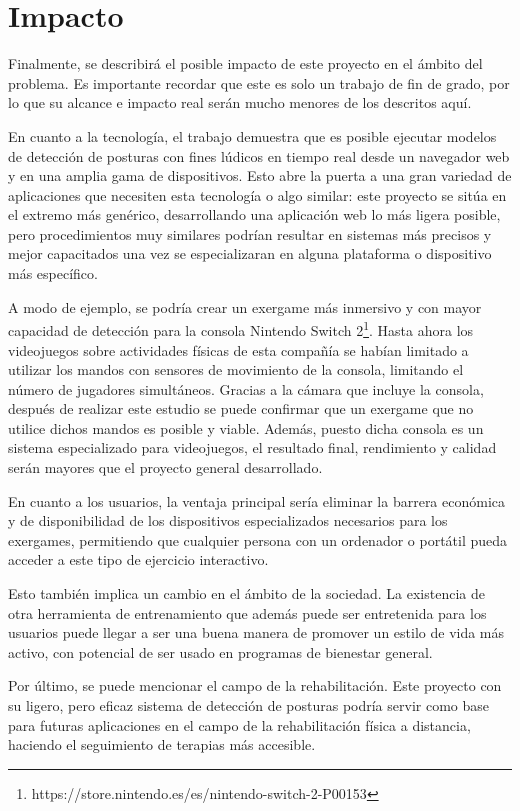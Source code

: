 \section{Impacto}
\label{sec:impacto}
Finalmente, se describirá el posible impacto de este proyecto en el ámbito del problema. Es
importante recordar que este es solo un trabajo de fin de grado, por lo que su alcance e impacto
real serán mucho menores de los descritos aquí.

En cuanto a la tecnología, el trabajo demuestra que es posible ejecutar modelos de detección de
posturas con fines lúdicos en tiempo real desde un navegador web y en una amplia gama de
dispositivos. Esto abre la puerta a una gran variedad de aplicaciones que necesiten esta tecnología
o algo similar: este proyecto se sitúa en el extremo más genérico, desarrollando una aplicación web
lo más ligera posible, pero procedimientos muy similares podrían resultar en sistemas más precisos y
mejor capacitados una vez se especializaran en alguna plataforma o dispositivo más específico.

A modo de ejemplo, se podría crear un \gls{exergame} más inmersivo y con mayor
capacidad de detección para la consola Nintendo Switch 2\footnote%
{https://store.nintendo.es/es/nintendo-switch-2-P00153}. Hasta ahora los
videojuegos sobre actividades físicas de esta compañía se habían limitado a
utilizar los mandos con sensores de movimiento de la consola, limitando el
número de jugadores simultáneos\footnotemark. Gracias a la cámara que incluye la
consola, después de realizar este estudio se puede confirmar que un
\gls{exergame} que no utilice dichos mandos es posible y viable. Además, puesto
dicha consola es un sistema especializado para videojuegos, el resultado final,
rendimiento y calidad serán mayores que el proyecto general desarrollado.


En cuanto a los usuarios, la ventaja principal sería eliminar la barrera
económica y de disponibilidad de los dispositivos especializados necesarios para
los \glspl{exergame}, permitiendo que cualquier persona con un ordenador o
portátil pueda acceder a este tipo de ejercicio interactivo.

Esto también implica un cambio en el ámbito de la sociedad. La existencia de
otra herramienta de entrenamiento que además puede ser entretenida para los
usuarios puede llegar a ser una buena manera de promover un estilo de vida más
activo, con potencial de ser usado en programas de bienestar general.

Por último, se puede mencionar el campo de la rehabilitación. Este proyecto con
su ligero, pero eficaz sistema de detección de posturas podría servir como base
para futuras aplicaciones en el campo de la rehabilitación física a distancia,
haciendo el seguimiento de terapias más accesible.

